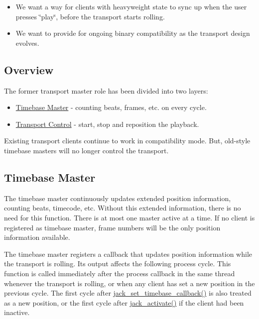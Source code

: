 \begin{itemize}
\item We want a way for clients with heavyweight state to sync up when the user presses \char`\"{}play\char`\"{}, before the transport starts rolling.\end{itemize}


\begin{itemize}
\item We want to provide for ongoing binary compatibility as the transport design evolves.\end{itemize}
\hypertarget{transport-design_overview}{}\subsection{Overview}\label{transport-design_overview}
The former transport master role has been divided into two layers:

\begin{itemize}
\item \hyperlink{transport-design_timebase}{Timebase Master} - counting beats, frames, etc. on every cycle.\item \hyperlink{transport-design_transportcontrol}{Transport Control} - start, stop and reposition the playback.\end{itemize}


Existing transport clients continue to work in compatibility mode. But, old-style timebase masters will no longer control the transport.\hypertarget{transport-design_timebase}{}\subsection{Timebase Master}\label{transport-design_timebase}
The timebase master continuously updates extended position information, counting beats, timecode, etc. Without this extended information, there is no need for this function. There is at most one master active at a time. If no client is registered as timebase master, frame numbers will be the only position information available.

The timebase master registers a callback that updates position information while the transport is rolling. Its output affects the following process cycle. This function is called immediately after the process callback in the same thread whenever the transport is rolling, or when any client has set a new position in the previous cycle. The first cycle after \hyperlink{transport_8h_d1d237a74417e8b4a4bc7894afefc1cb}{jack\_\-set\_\-timebase\_\-callback()} is also treated as a new position, or the first cycle after \hyperlink{jack_8h_c7dc9d6132b8331ab500cdb593b8de11}{jack\_\-activate()} if the client had been inactive.



